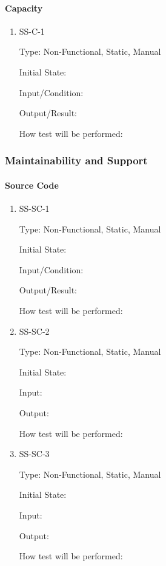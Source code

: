 \documentclass[11pt]{article}
\begin{document}
\paragraph{Capacity}

\begin{enumerate}

\item{SS-C-1\\}

Type: Non-Functional, Static, Manual
					
Initial State: 
					
Input/Condition: 
					
Output/Result: 
					
How test will be performed: 

\end{enumerate}

\subsubsection{Maintainability and Support}

\paragraph{Source Code}

\begin{enumerate}

\item{SS-SC-1\\}

Type: Non-Functional, Static, Manual
					
Initial State: 
					
Input/Condition: 
					
Output/Result: 
					
How test will be performed: 
					
\item{SS-SC-2\\}

Type: Non-Functional, Static, Manual
					
Initial State: 
					
Input: 
					
Output: 
					
How test will be performed:

\item{SS-SC-3\\}

Type: Non-Functional, Static, Manual
					
Initial State: 
					
Input: 
					
Output: 
					
How test will be performed: 

\end{enumerate}
\end{document}
